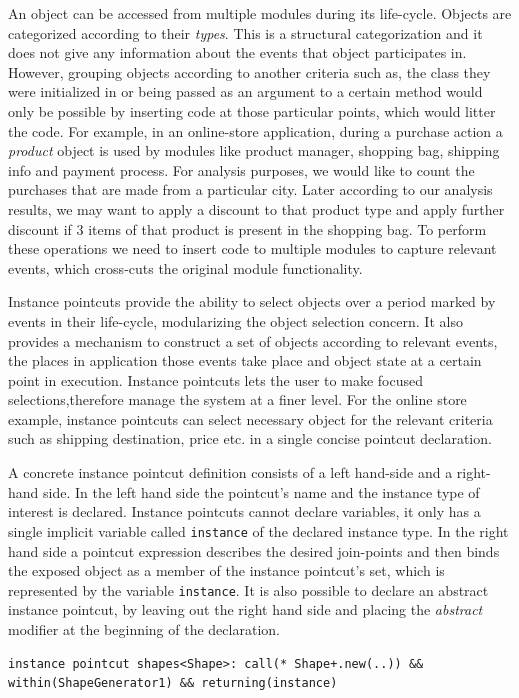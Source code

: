 \documentclass{llncs}
\begin{document}
An object can be accessed from multiple modules during its life-cycle. Objects are categorized according to their \emph{types}. This is a structural categorization and it does not give any information about the events that object participates in. However, grouping objects according to another criteria such as, the class they were initialized in or being passed as an argument to a certain method would only be possible by inserting code at those particular points, which would litter the code.  For example, in an online-store application, during a purchase action a \emph{product} object is used by modules like product manager, shopping bag, shipping info and payment process. For analysis purposes, we would like to count the purchases that are made from a particular city. Later according to our analysis results, we may want to apply a discount to that product type and apply further discount if 3 items of that product is present in the shopping bag. To perform these operations we need to insert code to multiple modules to capture relevant events, which cross-cuts the original module functionality.

Instance pointcuts provide the ability to select objects over a period marked by events in their life-cycle, modularizing the object selection concern. It also provides a mechanism to construct a set of objects according to relevant events, the places in application those events take place and object state at a certain point in execution. Instance pointcuts lets the user to make focused selections,therefore manage the system at a finer level. For the online store example, instance pointcuts can select necessary object for the relevant criteria such as shipping destination, price etc. in a single concise pointcut declaration. 

A concrete instance pointcut definition consists of a left hand-side and a right-hand side. In the left hand side the pointcut's name and the instance type of interest is declared. Instance pointcuts cannot declare variables, it only has a single implicit variable called \texttt{instance} of the declared instance type. In the right hand side a pointcut expression describes the desired join-points and then binds the exposed object as a member of the instance pointcut's set, which is represented by the variable \texttt{instance}.  It is also possible to declare an abstract instance pointcut, by leaving out the right hand side and placing the \emph{abstract} modifier at the beginning of the declaration.
\begin{lstlisting}[float=h!]
instance pointcut shapes<Shape>: call(* Shape+.new(..)) && within(ShapeGenerator1) && returning(instance)
\end{lstlisting}
\end{document}
